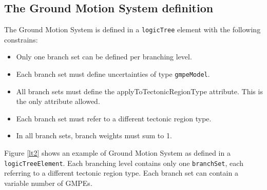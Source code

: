 \subsection{The Ground Motion System definition}
The Ground Motion System is defined in a \Verb+logicTree+ element with the following constrains:
\begin{itemize}
\item Only one branch set can be defined per branching level.
\item Each branch set must define uncertainties of type \Verb+gmpeModel+.
\item All branch sets must define the applyToTectonicRegionType attribute. This is the only attribute allowed.
\item Each branch set must refer to a different tectonic region type.
\item In all branch sets, branch weights must sum to 1.
\end{itemize}
Figure \ref{lt2} shows an example of Ground Motion System as defined in a \Verb+logicTreeElement+. Each branching level contains only one \Verb+branchSet+, each referring to a different tectonic region type. Each branch set can contain a variable number of GMPEs.
